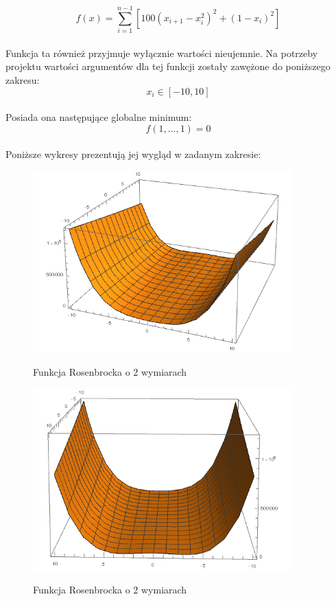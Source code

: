\documentclass[twoside]{projektInzynierskiMS1}
\newcommand{\si}{ś}
\begin{document}
\[f(x) = \sum_{i=1}^{n-1} [100(x_{i+1} - x_i^2)^2 + (1- x_i)^2 ]\] \\


Funkcja ta również przyjmuje wyłącznie warto\si ci nieujemnie. Na potrzeby projektu warto\si ci argumentów dla tej funkcji zostały zawężone do poniższego zakresu:
\[x_i \in [-10, 10] \] \\

Posiada ona następujące globalne minimum:
\[ f(1,...,1) = 0 \] \\

Poniższe wykresy prezentują jej wygląd w zadanym zakresie:\\
\begin{figure}[H]
	\begin{center}
		\includegraphics[height=7cm]{rosenbrockFunction1.png}\\
	\end{center}
	\caption{Funkcja Rosenbrocka o 2 wymiarach}
\end{figure}
\begin{figure}[H]
	\begin{center}
		\includegraphics[height=7cm]{rosenbrockFunction2.png}\\
	\end{center}
	\caption{Funkcja Rosenbrocka o 2 wymiarach}
\end{figure}
\end{document}
